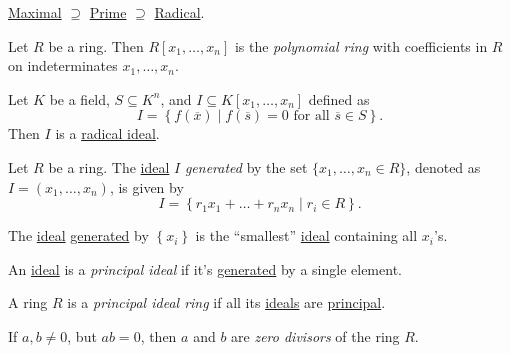 \begin{remark}
	\hyperref[def:proper-ideal-maximal]{Maximal} \(\supseteq \) \hyperref[def:prime]{Prime} \(\supseteq \) \hyperref[def:radical]{Radical}.
\end{remark}

\begin{definition}\label{def:polynomial-ring}
	Let \(R\) be a ring. Then \(R[x_1, \dots , x_n]\) is the \emph{polynomial ring} with coefficients in \(R\) on indeterminates \(x_1, \dots , x_n\).
\end{definition}

\begin{eg}
	Let \(K\) be a field, \(S \subseteq K^n\), and \(I \subseteq K[x_1, \dots , x_n]\) defined as
	\[
		I=\left\{ f(\overline{x} ) \mid f(\overline{s} )= 0\text{ for all }\overline{s} \in S \right\}.
	\]
	Then \(I\) is a \hyperref[def:radical]{radical ideal}.
\end{eg}


\begin{definition}\label{def:ideal-generation}
	Let \(R\) be a ring. The \hyperref[def:ideal]{ideal} \(I\) \emph{generated} by the set \(\{x_1, \dots , x_n\in R\}\), denoted as \(I=(x_1, \dots , x_n)\), is given by
	\[
		I = \left\{ r_1 x_1 + \dots + r_n x_n \mid r_i \in R \right\}.
	\]
\end{definition}

\begin{intuition}
	The \hyperref[def:ideal]{ideal} \hyperref[def:ideal-generation]{generated} by \(\left\{ x_i \right\} \) is the ``smallest'' \hyperref[def:ideal]{ideal} containing all \(x_i\)'s.
\end{intuition}

\begin{definition}\label{def:principal-ideal}
	An \hyperref[def:ideal]{ideal} is a \emph{principal ideal} if it's \hyperref[def:ideal-generation]{generated} by a single element.
\end{definition}

\begin{definition}\label{def:principal-ideal-ring}
	A ring \(R\) is a \emph{principal ideal ring} if all its \hyperref[def:ideal]{ideals} are \hyperref[def:principal-ideal]{principal}.
\end{definition}

\begin{prev}\label{prev:zero-divisor}
	If \(a, b \neq 0\), but \(ab = 0\), then \(a\) and \(b\) are \emph{zero divisors} of the ring \(R\).
\end{prev}

